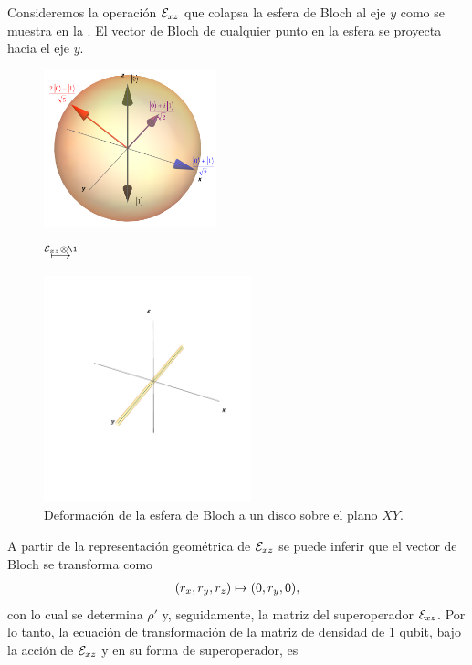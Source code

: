 Consideremos la operación $\mathcal{E}_{xz}$ que colapsa la esfera de Bloch
al eje $y$ como se muestra en la . El vector de 
Bloch de cualquier punto en la esfera se proyecta hacia el eje $y$.
\begin{figure}[H]
    \centering
    \begin{minipage}{.4\textwidth}
        \centering
        \includegraphics[width=5cm]
        {img-congreso/bloch.png}
    \end{minipage}
    $\stackrel{\E_{xz}\otimes\1 \vspace{1cm}}{\longmapsto}$
    \begin{minipage}{0.4\textwidth}
        \centering
        \includegraphics[width=6cm]
        {img-congreso/lineY}
    \end{minipage}
    \caption{Deformación de la esfera de Bloch a un disco sobre el plano $XY$.}
    \label{fig:QC-ex2}
\end{figure}
A partir de la representación geométrica de $\mathcal{E}_{xz}$ 
se puede inferir que el vector de Bloch se transforma 
como
\begin{align}
\qty(r_x,r_y,r_z)\mapsto\qty(0,r_y,0),
\label{eq:Bloch-vec-mapToY}
\end{align}
con lo cual se determina $\rho'$ y, seguidamente,
la matriz del superoperador $\mathcal{E}_{xz}$.
Por lo tanto, la ecuación de transformación de la matriz 
de densidad de 1 qubit, bajo la acción de $\mathcal{E}_{xz}$ y 
en su forma de superoperador, es
